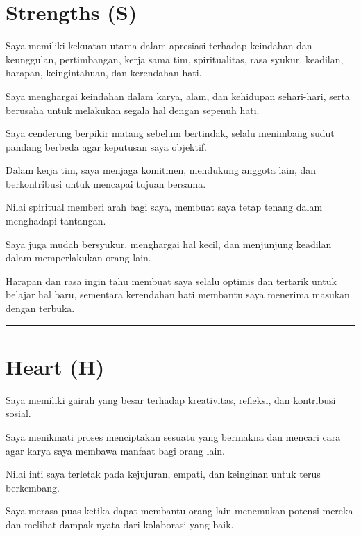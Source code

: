 \documentclass[
  letterpaper,
  DIV=11,
  numbers=noendperiod]{scrreprt}
\begin{document}
\section*{Strengths (S)}\label{strengths-s}


Saya memiliki kekuatan utama dalam apresiasi terhadap keindahan dan
keunggulan, pertimbangan, kerja sama tim, spiritualitas, rasa syukur,
keadilan, harapan, keingintahuan, dan kerendahan hati.

Saya menghargai keindahan dalam karya, alam, dan kehidupan sehari-hari,
serta berusaha untuk melakukan segala hal dengan sepenuh hati.

Saya cenderung berpikir matang sebelum bertindak, selalu menimbang sudut
pandang berbeda agar keputusan saya objektif.

Dalam kerja tim, saya menjaga komitmen, mendukung anggota lain, dan
berkontribusi untuk mencapai tujuan bersama.

Nilai spiritual memberi arah bagi saya, membuat saya tetap tenang dalam
menghadapi tantangan.

Saya juga mudah bersyukur, menghargai hal kecil, dan menjunjung keadilan
dalam memperlakukan orang lain.

Harapan dan rasa ingin tahu membuat saya selalu optimis dan tertarik
untuk belajar hal baru, sementara kerendahan hati membantu saya menerima
masukan dengan terbuka.

\begin{center}\rule{0.5\linewidth}{0.5pt}\end{center}

\section*{Heart (H)}\label{heart-h}


Saya memiliki gairah yang besar terhadap kreativitas, refleksi, dan
kontribusi sosial.

Saya menikmati proses menciptakan sesuatu yang bermakna dan mencari cara
agar karya saya membawa manfaat bagi orang lain.

Nilai inti saya terletak pada kejujuran, empati, dan keinginan untuk
terus berkembang.

Saya merasa puas ketika dapat membantu orang lain menemukan potensi
mereka dan melihat dampak nyata dari kolaborasi yang baik.
\end{document}
